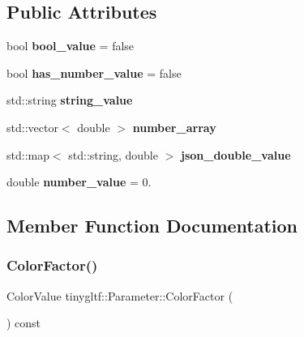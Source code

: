 \subsection*{Public Attributes}
\begin{DoxyCompactItemize}
\item 
\mbox{\label{structtinygltf_1_1Parameter_afc435ef3a415e761bf6c9818f24eca3f}} 
bool {\bfseries bool\+\_\+value} = false
\item 
\mbox{\label{structtinygltf_1_1Parameter_aabd39c19961f29867ed056654ebfe230}} 
bool {\bfseries has\+\_\+number\+\_\+value} = false
\item 
\mbox{\label{structtinygltf_1_1Parameter_ac506199702869bd7ae4df72c57324d8a}} 
std\+::string {\bfseries string\+\_\+value}
\item 
\mbox{\label{structtinygltf_1_1Parameter_a5c133aced84fa8e0a1b2c97ca74d865d}} 
std\+::vector$<$ double $>$ {\bfseries number\+\_\+array}
\item 
\mbox{\label{structtinygltf_1_1Parameter_a3da37eec32874272dcdb55ea0cb4a650}} 
std\+::map$<$ std\+::string, double $>$ {\bfseries json\+\_\+double\+\_\+value}
\item 
\mbox{\label{structtinygltf_1_1Parameter_a445b16f857b4f4386446f0e6da5fe17a}} 
double {\bfseries number\+\_\+value} = 0.
\end{DoxyCompactItemize}


\subsection{Member Function Documentation}
\mbox{\label{structtinygltf_1_1Parameter_abb8f9eafdac3746a5858ca89612e2516}} 
\subsubsection{\texorpdfstring{Color\+Factor()}{ColorFactor()}}
{\footnotesize\ttfamily Color\+Value tinygltf\+::\+Parameter\+::\+Color\+Factor (\begin{DoxyParamCaption}{ }\end{DoxyParamCaption}) const\hspace{0.3cm}{\ttfamily [inline]}}

